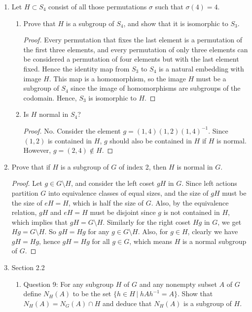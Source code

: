 \documentclass{article}
\begin{document}
\begin{enumerate}
  \item Let $H\subset S_4$ consist of all those permutations $\sigma$ such
    that $\sigma(4)=4$.

    \begin{enumerate}
      \item Prove that $H$ is a subgroup of $S_4$, and show that it is
        isomorphic to $S_3$.
        \begin{proof}
          Every permutation that fixes the last element is a permutation of
          the first three elements, and every permutation of only three
          elements can be considered a permutation of four elements but
          with the last element fixed. Hence the identity map from $S_3$
          to $S_4$ is a natural embedding with image $H$. This map is a
          homomorphism, so the image $H$ must be a subgroup of $S_4$ since
          the image of homomorphisms are subgroups of the codomain. Hence,
          $S_3$ is isomorphic to $H$.
        \end{proof}

      \item Is $H$ normal in $S_4$?
        \begin{proof}
          No. Consider the element $g=(1,4)(1,2)(1,4)^{-1}$. Since
          $(1,2)$ is contained in $H$, $g$ should also be contained in $H$
          if $H$ is normal. However, $g=(2,4)\not\in H$.
        \end{proof}
    \end{enumerate}

  \item Prove that if $H$ is a subgroup of $G$ of index 2, then $H$ is
    normal in $G$.
    \begin{proof}
      Let $g\in G\setminus H$, and consider the left coset $gH$ in $G$.
      Since left actions partition $G$ into equivalence classes of equal
      sizes, and the size of $gH$ must be the size of $eH=H$, which is half
      the size of $G$. Also, by the equivalence relation, $gH$ and $eH=H$
      must be disjoint since $g$ is not contained in $H$, which implies
      that $gH=G\setminus H$. Similarly for the right coset $Hg$ in $G$, we
      get $Hg=G\setminus H$. So $gH=Hg$ for any $g\in G\setminus H$. Also,
      for $g\in H$, clearly we have $gH=Hg$, hence $gH=Hg$ for all $g\in
      G$, which means $H$ is a normal subgroup of $G$.
    \end{proof}

  \item Section 2.2
    \begin{enumerate}
      \item Question 9: For any subgroup $H$ of $G$ and any nonempty subset
        $A$ of $G$ define $N_H(A)$ to be the set $\{h\in H\,|\;
        hAh^{-1}=A\}$. Show that $N_H(A)=N_G(A)\cap H$ and deduce that
        $N_H(A)$ is a subgroup of $H$.


\end{enumerate}
\end{enumerate}
\end{document}
